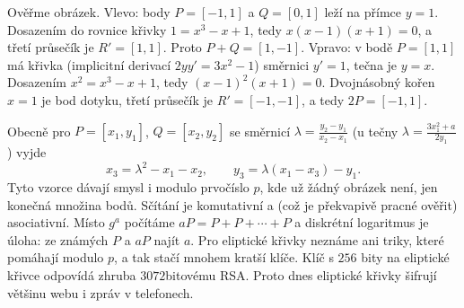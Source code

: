 \begin{center}
  \hspace{0.8cm}
\end{center}

Ověřme obrázek. Vlevo: body $P = [-1, 1]$ a $Q = [0, 1]$ leží na přímce $y = 1$. Dosazením do rovnice křivky $1 = x^3 - x + 1$, tedy $x(x - 1)(x + 1) = 0$, a třetí průsečík je $R' = [1, 1]$. Proto $P + Q = [1, -1]$. Vpravo: v bodě $P = [1, 1]$ má křivka (implicitní derivací $2yy' = 3x^2 - 1$) směrnici $y' = 1$, tečna je $y = x$. Dosazením $x^2 = x^3 - x + 1$, tedy ${(x - 1)}^2(x + 1) = 0$. Dvojnásobný kořen $x = 1$ je bod dotyku, třetí průsečík je $R' = [-1, -1]$, a tedy $2P = [-1, 1]$.

Obecně pro $P = [x_1, y_1]$, $Q = [x_2, y_2]$ se směrnicí $\lambda = \frac{y_2 - y_1}{x_2 - x_1}$ (u tečny $\lambda = \frac{3x_1^2 + a}{2y_1}$) vyjde
\begin{equation*}
  x_3 = \lambda^2 - x_1 - x_2,\qquad y_3 = \lambda(x_1 - x_3) - y_1.
\end{equation*}
Tyto vzorce dávají smysl i modulo prvočíslo $p$, kde už žádný obrázek není, jen konečná množina bodů. Sčítání je komutativní a (což je překvapivě pracné ověřit) asociativní. Místo $g^a$ počítáme $aP = P + P + \cdots + P$ a diskrétní logaritmus je úloha: ze známých $P$ a $aP$ najít $a$. Pro eliptické křivky neznáme ani triky, které pomáhají modulo $p$, a tak stačí mnohem kratší klíče. Klíč s $256$ bity na eliptické křivce odpovídá zhruba $3072$bitovému RSA. Proto dnes eliptické křivky šifrují většinu webu i zpráv v telefonech.

